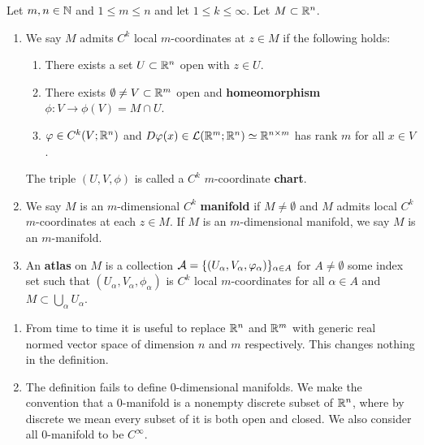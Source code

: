 \documentclass[a4paper]{article}
\begin{document}
\begin{defi}
Let $m, n \in \mathbb{N}$ and $1 \leq m \leq n$ and let
$1 \leq k \leq \infty$. Let $M \subset \mathbb{R}^n$.
\begin{enumerate}
\item We say $M$ admits $C^k$ local $m$-coordinates
at $z \in M$ if the following holds:
\begin{enumerate}
  \item There exists a set $U \subset \mathbb{R}^n$ open with
  $z \in U$.

  \item There exists $\emptyset \neq V \subset \mathbb{R}^m$ open
  and \textbf{homeomorphism} $\phi : V \to \phi(V) = M
  \cap U$.

  \item $\varphi \in C^k(V ; \mathbb{R}^n)$ and $D \varphi(x) \in \mathcal{L}(\mathbb{R}^m;
  \mathbb{R}^n) \simeq \mathbb{R}^{n \times m}$ has rank $m$ for all
  $x \in V$.
\end{enumerate}
The triple $(U, V, \phi)$ is called a $C^k$ $m$-coordinate
\textbf{chart}.

\item We say $M$ is an $m$-dimensional $C^k$ \textbf{manifold}
if $M \neq \emptyset$ and $M$ admits local $C^k$ $m$-coordinates
at each $z \in M$. If $M$ is an $m$-dimensional manifold,
we say $M$ is an $m$-manifold.

\item An \textbf{atlas} on $M$ is a collection
$\mathcal{A} = \{(U_\alpha, V_\alpha, \varphi_\alpha)\}_{\alpha \in A}$
for $A \neq \emptyset$ some index set such that
$(U_\alpha, V_\alpha, \phi_\alpha)$ is $C^k$ local $m$-coordinates
for all $\alpha \in A$ and $M \subset
\bigcup_\alpha U_\alpha$.
\end{enumerate}
\end{defi}

\begin{remark}
\begin{enumerate}
\item From time to time it is useful to replace $\mathbb{R}^n$
and $\mathbb{R}^m$ with generic real normed vector space of
dimension $n$ and $m$ respectively. This changes nothing
in the definition.

\item The definition fails to define $0$-dimensional
manifolds. We make the convention that a $0$-manifold is a
nonempty discrete subset of $\mathbb{R}^n$, where by discrete we mean
every subset of it is both open and closed. We also consider
all $0$-manifold to be $C^\infty$.
\end{enumerate}
\end{remark}
\end{document}
